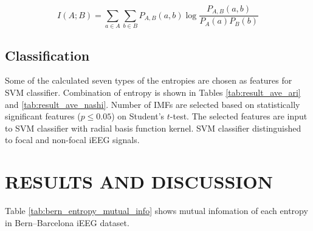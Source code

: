 \documentclass[letterpaper, 10 pt, conference]{ieeeconf}  %
\begin{document}
\begin{equation}
I(A;B) = \sum_{a\in A}\sum_{b\in B}P_{A,B}(a,b)\log\frac{P_{A,B}(a,b)}{P_A(a)P_B(b)}
\end{equation}


\subsection{Classification}
Some of the calculated seven types of the entropies are chosen as features for SVM classifier.
Combination of entropy is shown in Tables \ref{tab:result_ave_ari} and \ref{tab:result_ave_nashi}.
Number of IMFs are selected based on statistically significant features ($p \leq 0.05$) on Student's $t$-test.
The selected features are input to SVM classifier with radial basis function kernel.
SVM classifier distinguished to focal and non-focal iEEG signals.


\section{RESULTS AND DISCUSSION}
\begin{table*}[t]
	\begin{center}
		\caption{ Mutual infomation in Bern–Barcelona iEEG dataset}
		\label{tab:bern_entropy_mutual_info}
	\end{center}
\end{table*}
Table \ref{tab:bern_entropy_mutual_info} shows mutual infomation of each entropy in Bern–Barcelona iEEG dataset.
\end{document}

